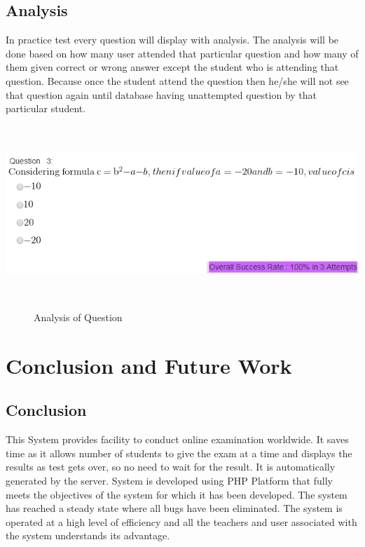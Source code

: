 \section{Analysis}
In practice test every question will display with analysis. The analysis will be done based on how many user attended that particular question and how many of them given correct or wrong answer except the student who is attending that question. Because once the student attend the question then he/she will not see that question again until database having unattempted question by that particular student.
\begin{center}
	\includegraphics[width=13.5cm, height=6.5cm]{analysis.png}
	\begin{figure}[h!]
		\centering
		\caption{Analysis of Question}%
	\end{figure}
\end{center}


\chapter{Conclusion and Future Work}

\section{Conclusion}
This System provides facility to conduct online examination worldwide. It saves time as it allows number of students to give the exam at a time and displays the results as test gets over, so no need to wait for the result. It is automatically generated by the server. System is developed using PHP Platform that fully meets the objectives of the system for which it has been developed. The system has reached a steady state where all bugs have been eliminated. The system is operated at a high level of eﬃciency and all the teachers and user associated with the system understands its advantage.\\

